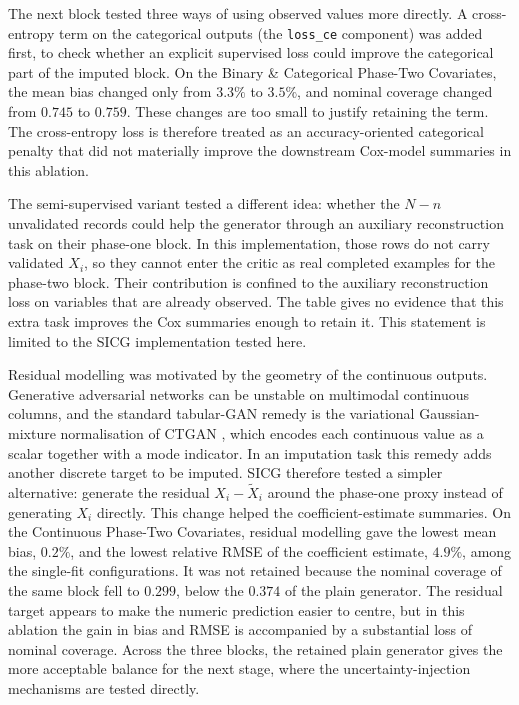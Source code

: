 The next block tested three ways of using observed values more directly. A cross-entropy term on the categorical outputs (the \texttt{loss\_ce} component) was added first, to check whether an explicit supervised loss could improve the categorical part of the imputed block. On the Binary \& Categorical Phase-Two Covariates, the mean bias changed only from \(3.3\%\) to \(3.5\%\), and nominal coverage changed from \(0.745\) to \(0.759\). These changes are too small to justify retaining the term. The cross-entropy loss is therefore treated as an accuracy-oriented categorical penalty that did not materially improve the downstream Cox-model summaries in this ablation.

The semi-supervised variant tested a different idea: whether the \(N-n\) unvalidated records could help the generator through an auxiliary reconstruction task on their phase-one block. In this implementation, those rows do not carry validated \(X_i\), so they cannot enter the critic as real completed examples for the phase-two block. Their contribution is confined to the auxiliary reconstruction loss on variables that are already observed. The table gives no evidence that this extra task improves the Cox summaries enough to retain it. This statement is limited to the SICG implementation tested here.

Residual modelling was motivated by the geometry of the continuous outputs. Generative adversarial networks can be unstable on multimodal continuous columns, and the standard tabular-GAN remedy is the variational Gaussian-mixture normalisation of CTGAN \citep{xu2019modeling}, which encodes each continuous value as a scalar together with a mode indicator. In an imputation task this remedy adds another discrete target to be imputed. SICG therefore tested a simpler alternative: generate the residual \(X_i-\tilde X_i\) around the phase-one proxy instead of generating \(X_i\) directly. This change helped the coefficient-estimate summaries. On the Continuous Phase-Two Covariates, residual modelling gave the lowest mean bias, \(0.2\%\), and the lowest relative RMSE of the coefficient estimate, \(4.9\%\), among the single-fit configurations. It was not retained because the nominal coverage of the same block fell to \(0.299\), below the \(0.374\) of the plain generator. The residual target appears to make the numeric prediction easier to centre, but in this ablation the gain in bias and RMSE is accompanied by a substantial loss of nominal coverage. Across the three blocks, the retained plain generator gives the more acceptable balance for the next stage, where the uncertainty-injection mechanisms are tested directly.

